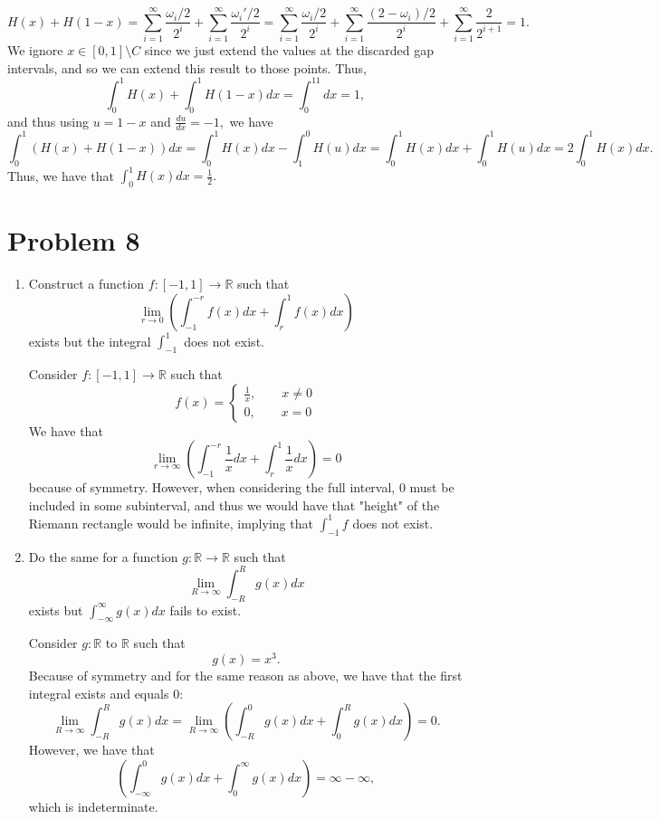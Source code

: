 \documentclass[11pt]{article}
\newcommand{\bbR}{\mathbb{R}}
\newcommand{\sm}{\setminus}
\begin{document}
\begin{enumerate}
\begin{solution}
\[H(x) + H(1-x) = \sum_{i=1}^\infty \frac{\omega_i/2}{2^i} + \sum_{i=1}^\infty \frac{\omega_i'/2}{2^i} = \sum_{i=1}^\infty \frac{\omega_i/2}{2^i} + \sum_{i=1}^\infty \frac{(2- \omega_i)/2}{2^i} + \sum_{i=1}^\infty \frac{2}{2^{i+1}} = 1.\] We ignore $x\in [0,1]\sm C$ since we just extend the values at the discarded gap intervals, and so we can extend this result to those points.  Thus,
\[\int_0^1H(x) + \int_0^1H(1-x)dx = \int_0^11dx = 1,\] and thus using $u = 1-x$ and $\frac{du}{dx} = -1,$ we have 
\[\int_0^1(H(x) + H(1-x))dx = \int_0^1H(x)dx - \int_1^0H(u)dx = \int_0^1H(x)dx + \int_0^1H(u)dx = 2\int_0^1H(x)dx.\]
Thus, we have that $\int_0^1H(x)dx = \frac{1}{2}.$
\end{solution}
\end{enumerate}
\newpage
\section*{Problem 8}
\begin{enumerate}
    \item 
    \begin{problem}
    Construct a function $f:[-1,1]\to \bbR$ such that 
    \[\lim_{r\to 0}\left(\int_{-1}^{-r}f(x)dx + \int_r^1f(x)dx\right)\] exists but the integral $\int_{-1}^1$ does not exist.    
    \end{problem}
    \begin{solution}
    Consider $f:[-1,1]\to \bbR$ such that 
    \[f(x) = 
    \begin{cases}
        \frac{1}{x}, \qquad x\neq 0\\
        0, \qquad x = 0
    \end{cases}\] We have that \[\lim_{r\to \infty}\left(\int_{-1}^{-r}\frac{1}{x}dx + \int_r^1 \frac{1}{x}dx\right) = 0\] because of symmetry. However, when considering the full interval, $0$ must be included in some subinterval, and thus we would have that "height" of the Riemann rectangle would be infinite, implying that $\int_{-1}^1 f$ does not exist.
    \end{solution}
    \item 
    \begin{problem}
    Do the same for a function $g: \bbR \to \bbR$ such that \[\lim_{R\to \infty}\int_{-R}^Rg(x)dx\] exists but $\int_{-\infty}^\infty g(x)dx$ fails to exist.
    \end{problem}
    \begin{solution}
        Consider $g: \bbR$ to $\bbR$ such that 
        \[g(x) = x^3.\] Because of symmetry and for the same reason as above, we have that the first integral exists and equals $0$:
        \[\lim_{R\to \infty}\int_{-R}^R g(x)dx = \lim_{R\to \infty}\left(\int_{-R}^0g(x)dx + \int_0^Rg(x)dx\right) = 0.\]
        However, we have that \[\left(\int_{-\infty}^0g(x)dx + \int_0^\infty g(x)dx\right) = \infty - \infty,\] which is indeterminate.
    \end{solution}
\end{enumerate}
\newpage
\end{document}
